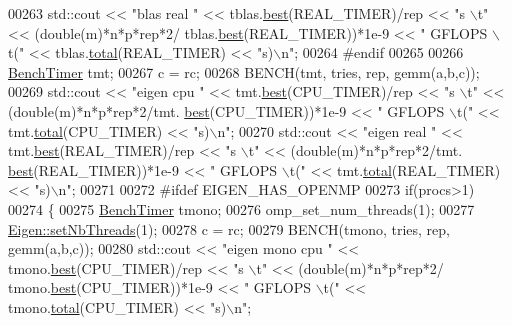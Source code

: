 \begin{DoxyCode}
00263   std::cout << \textcolor{stringliteral}{"blas  real        "} << tblas.\hyperlink{class_eigen_1_1_bench_timer_ae8b673b0fa356d3432c7a65c79e8af0e}{best}(REAL\_TIMER)/rep << \textcolor{stringliteral}{"s  \(\backslash\)t"} << (double(m)*n*p*rep*2/
      tblas.\hyperlink{class_eigen_1_1_bench_timer_ae8b673b0fa356d3432c7a65c79e8af0e}{best}(REAL\_TIMER))*1e-9 <<  \textcolor{stringliteral}{" GFLOPS \(\backslash\)t("} << tblas.\hyperlink{class_eigen_1_1_bench_timer_af341aa613dba2d4a3d167093197e4e7a}{total}(REAL\_TIMER) << \textcolor{stringliteral}{"s)\(\backslash\)n"};
00264 \textcolor{preprocessor}{  #endif}
00265 
00266   \hyperlink{class_eigen_1_1_bench_timer}{BenchTimer} tmt;
00267   c = rc;
00268   BENCH(tmt, tries, rep, gemm(a,b,c));
00269   std::cout << \textcolor{stringliteral}{"eigen cpu         "} << tmt.\hyperlink{class_eigen_1_1_bench_timer_ae8b673b0fa356d3432c7a65c79e8af0e}{best}(CPU\_TIMER)/rep  << \textcolor{stringliteral}{"s  \(\backslash\)t"} << (double(m)*n*p*rep*2/tmt.
      \hyperlink{class_eigen_1_1_bench_timer_ae8b673b0fa356d3432c7a65c79e8af0e}{best}(CPU\_TIMER))*1e-9  <<  \textcolor{stringliteral}{" GFLOPS \(\backslash\)t("} << tmt.\hyperlink{class_eigen_1_1_bench_timer_af341aa613dba2d4a3d167093197e4e7a}{total}(CPU\_TIMER)  << \textcolor{stringliteral}{"s)\(\backslash\)n"};
00270   std::cout << \textcolor{stringliteral}{"eigen real        "} << tmt.\hyperlink{class_eigen_1_1_bench_timer_ae8b673b0fa356d3432c7a65c79e8af0e}{best}(REAL\_TIMER)/rep << \textcolor{stringliteral}{"s  \(\backslash\)t"} << (double(m)*n*p*rep*2/tmt.
      \hyperlink{class_eigen_1_1_bench_timer_ae8b673b0fa356d3432c7a65c79e8af0e}{best}(REAL\_TIMER))*1e-9 <<  \textcolor{stringliteral}{" GFLOPS \(\backslash\)t("} << tmt.\hyperlink{class_eigen_1_1_bench_timer_af341aa613dba2d4a3d167093197e4e7a}{total}(REAL\_TIMER) << \textcolor{stringliteral}{"s)\(\backslash\)n"};
00271 
00272 \textcolor{preprocessor}{  #ifdef EIGEN\_HAS\_OPENMP}
00273   \textcolor{keywordflow}{if}(procs>1)
00274   \{
00275     \hyperlink{class_eigen_1_1_bench_timer}{BenchTimer} tmono;
00276     omp\_set\_num\_threads(1);
00277     \hyperlink{namespace_eigen_af9cd17c2fe18204239cd11c88c120b50}{Eigen::setNbThreads}(1);
00278     c = rc;
00279     BENCH(tmono, tries, rep, gemm(a,b,c));
00280     std::cout << \textcolor{stringliteral}{"eigen mono cpu    "} << tmono.\hyperlink{class_eigen_1_1_bench_timer_ae8b673b0fa356d3432c7a65c79e8af0e}{best}(CPU\_TIMER)/rep  << \textcolor{stringliteral}{"s  \(\backslash\)t"} << (double(m)*n*p*rep*2/
      tmono.\hyperlink{class_eigen_1_1_bench_timer_ae8b673b0fa356d3432c7a65c79e8af0e}{best}(CPU\_TIMER))*1e-9  <<  \textcolor{stringliteral}{" GFLOPS \(\backslash\)t("} << tmono.\hyperlink{class_eigen_1_1_bench_timer_af341aa613dba2d4a3d167093197e4e7a}{total}(CPU\_TIMER)  << \textcolor{stringliteral}{"s)\(\backslash\)n"};

\end{DoxyCode}
